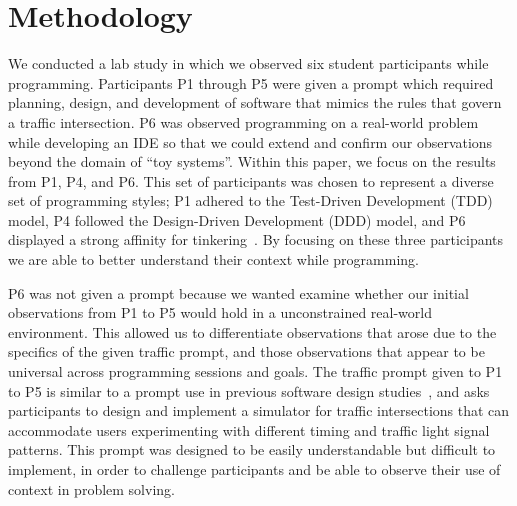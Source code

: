 
\section{Methodology}

We conducted a lab study in which we observed six student participants while programming. Participants P1 through P5 were given a prompt which required planning, design, and development of software that mimics the rules that govern a traffic intersection. P6 was observed programming on a real-world problem while developing an IDE so that we could extend and confirm our observations beyond the domain of ``toy systems''. Within this paper, we focus on the results from P1, P4, and P6. This set of participants was chosen to represent a diverse set of programming styles; P1 adhered to the Test-Driven Development (TDD) model, P4 followed the Design-Driven Development (DDD) model, and P6 displayed a strong affinity for tinkering~\cite{Beckwith:2006}. By focusing on these three participants we are able to better understand their context while programming. 


P6 was not given a prompt because we wanted examine whether our initial observations from P1 to P5 would hold in a unconstrained real-world environment. This allowed us to differentiate observations that arose due to the specifics of the given traffic prompt, and those observations that appear to be universal across programming sessions and goals. The traffic prompt given to P1 to P5 is similar to a prompt use in previous software design studies~\cite{Mangano:2012}, and asks participants to design and implement a simulator for traffic intersections that can accommodate users experimenting with different timing and traffic light signal patterns. This prompt was designed to be easily understandable but difficult to implement, in order to challenge participants and be able to observe their use of context in problem solving.

